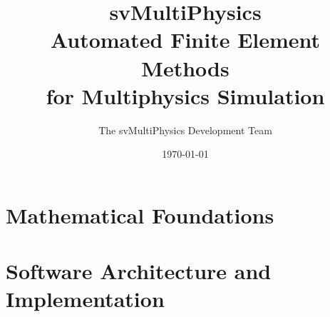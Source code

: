 \documentclass[11pt,twoside,openright]{book}
\title{%
  \textbf{svMultiPhysics} \\[0.5em]
  \Large Automated Finite Element Methods \\
  for Multiphysics Simulation
}
\author{The svMultiPhysics Development Team}
\date{\today}
\theoremstyle{plain}
\theoremstyle{definition}
\theoremstyle{remark}
\begin{document}
\frontmatter







\tableofcontents



\mainmatter

\part{Mathematical Foundations}
\label{part:foundations}














\part{Software Architecture and Implementation}
\label{part:implementation}








\end{document}
